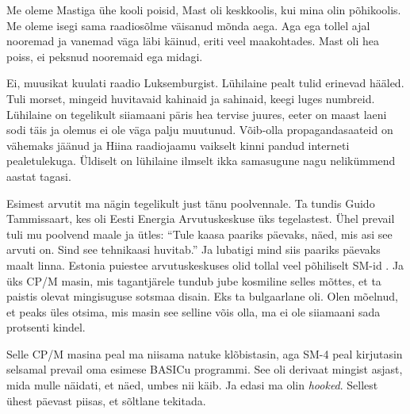 
Me oleme Mastiga ühe kooli poisid, Mast oli keskkoolis, kui mina olin 
põhikoolis. Me oleme isegi sama 
raadiosõlme väisanud mõnda aega. Aga ega tollel ajal nooremad ja vanemad väga 
läbi käinud, eriti veel 
maakohtades. Mast oli hea 
poiss, ei peksnud nooremaid ega midagi. 


Ei, muusikat kuulati raadio Luksemburgist. Lühilaine pealt tulid erinevad 
hääled. Tuli morset, mingeid huvitavaid kahinaid ja sahinaid, keegi 
luges numbreid. Lühilaine on tegelikult siiamaani päris hea tervise 
juures, eeter on maast laeni sodi täis ja olemus 
ei ole väga palju muutunud. Võib-olla propagandasaateid on vähemaks 
jäänud ja Hiina raadiojaamu vaikselt kinni pandud  
interneti pealetulekuga. Üldiselt on lühilaine ilmselt ikka samasugune nagu 
nelikümmend aastat tagasi.


Esimest arvutit ma nägin tegelikult just tänu poolvennale. Ta tundis Guido 
Tammissaart, kes oli Eesti Energia 
Arvutuskeskuse üks tegelastest. Ühel 
prevail tuli mu poolvend maale ja ütles: \enquote{Tule kaasa paariks päevaks, 
näed, mis asi 
see arvuti on. Sind see tehnikaasi huvitab.} Ja lubatigi mind siis paariks 
päevaks maalt 
linna. Estonia puiestee arvutuskeskuses olid tollal veel põhiliselt 
SM-id . Ja 
üks CP/M 
masin, mis tagantjärele tundub jube kosmiline selles mõttes, et ta paistis 
olevat 
mingisuguse sotsmaa disain. Eks ta bulgaarlane oli. Olen mõelnud, et 
peaks üles otsima, mis masin see selline võis olla, ma ei ole siiamaani sada 
protsenti kindel. 

Selle CP/M masina peal ma niisama natuke klõbistasin, aga 
SM-4 peal 
kirjutasin selsamal prevail oma esimese BASICu programmi. 
See oli derivaat mingist asjast, mida mulle näidati, et näed, umbes nii 
käib. Ja edasi ma olin \emph{hooked}. Sellest ühest päevast piisas, et sõltlane 
tekitada. 

